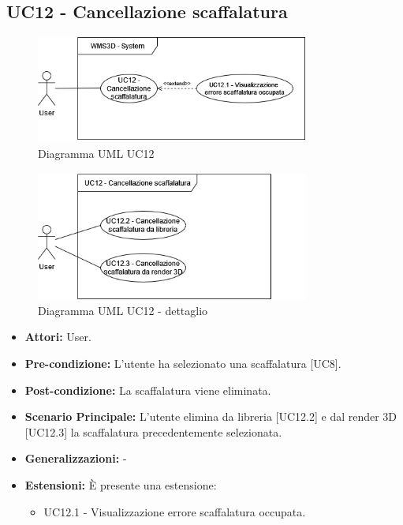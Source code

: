 \subsection{UC12 - Cancellazione scaffalatura}
\begin{figure}[H]
  \centering
  \includegraphics[width=0.8\textwidth]{UC_diagrams_11-20/UC12_sys.drawio.png}
   \caption{Diagramma UML UC12}
\end{figure}
\begin{figure}[H]
  \centering
  \includegraphics[width=0.8\textwidth]{UC_diagrams_11-20/UC12.drawio.png}
   \caption{Diagramma UML UC12 - dettaglio}
\end{figure}
\begin{itemize}
    \item \textbf{Attori:} User.
    \item \textbf{Pre-condizione:} L'utente ha selezionato una scaffalatura [UC8].
    \item \textbf{Post-condizione:} La scaffalatura viene eliminata.
    \item \textbf{Scenario Principale:} L'utente elimina da libreria [UC12.2] e dal render 3D [UC12.3] la scaffalatura precedentemente selezionata.
    \item \textbf{Generalizzazioni:} -
    \item \textbf{Estensioni:} È presente una estensione:
    \begin{itemize}
        \item UC12.1 - Visualizzazione errore scaffalatura occupata.
    \end{itemize}
\end{itemize}


